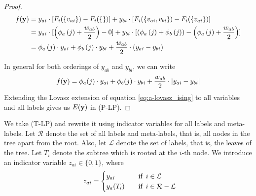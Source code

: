 {{{\begin{proof}
\begin{align}
f({\bf y}) &= y_{ai} \cdot [F_i(\{v_{ai}\}) - F_i(\{\})] + y_{bi} \cdot [F_i(\{v_{ai}, v_{bi}\}) - F_i(\{v_{ai}\})] \nonumber \\
&= y_{ai} \cdot [\left(\phi_{a}\left(j\right) + \frac{w_{ab}}{2}\right) - 0] + y_{bi} \cdot [\left(\phi_{a}\left(j\right) + \phi_{b}\left(j\right)\right) - \left(\phi_{a}\left(j\right) + \frac{w_{ab}}{2}\right)] \nonumber \\
&=  \phi_{a}\left(j\right) \cdot y_{ai} + \phi_{b}\left(j\right) \cdot y_{bi} + \frac{w_{ab}}{2} \cdot \left(y_{ai} - y_{bi}\right)
\end{align}

In general for both orderings of $y_{ab}$ and $y_{bi}$, we can write
%
\begin{equation}
f({\bf y}) = \phi_{a}(j) \cdot y_{ai} + \phi_{b}(j) \cdot y_{bi} + \frac{w_{ab}}{2} \cdot |y_{ai} - y_{bi}|
\end{equation}
%
Extending the Lovasz extension of equation \eqref{eq:a-lovasz_ising} to all variables and all labels gives us $E({\bf y})$ in (P-LP). 
\end{proof}

 We take (T-LP) and rewrite it using indicator variables for all labels and meta-labels. Let $\mathcal R$ denote the set of all labels and meta-labels, that is, all nodes in the tree apart from the root. Also, let $\mathcal L$ denote the set of labels, that is, the leaves of the tree. Let $T_i$ denote the subtree which is rooted at the $i$-th node. We introduce an indicator variable $z_{ai} \in \{0, 1\}$, where
\begin{align}
    \enskip  z_{ai} =  \begin{cases} 
        y_{ai} \quad &\text{if} \enskip i \in {\mathcal L} \\
        y_{a}(T_i) \quad &\text{if} \enskip i \in {\mathcal R - \mathcal L} \\
    \end{cases}
\end{align}

}}}
